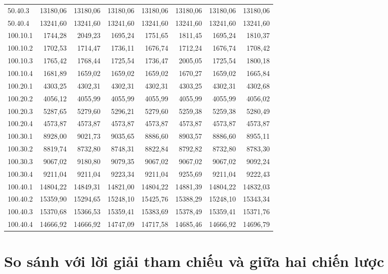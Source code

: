 \documentclass[../DoAn.tex]{subfiles}
\begin{document}
\begin{small}
\begin{longtable}{l|rrrrr|rr}
50.40.3 & 13180,06 & 13180,06 & 13180,06 & 13180,06 & 13180,06 & 13180,06 & 13180,06 \\
50.40.4 & 13241,60 & 13241,60 & 13241,60 & 13241,60 & 13241,60 & 13241,60 & 13241,60 \\
100.10.1 & 1744,28 & 2049,23 & 1695,24 & 1751,65 & 1811,45 & 1695,24 & 1810,37 \\
100.10.2 & 1702,53 & 1714,47 & 1736,11 & 1676,74 & 1712,24 & 1676,74 & 1708,42 \\
100.10.3 & 1765,42 & 1768,44 & 1725,54 & 1736,47 & 2005,05 & 1725,54 & 1800,18 \\
100.10.4 & 1681,89 & 1659,02 & 1659,02 & 1659,02 & 1670,27 & 1659,02 & 1665,84 \\
100.20.1 & 4303,25 & 4302,31 & 4302,31 & 4302,31 & 4303,25 & 4302,31 & 4302,68 \\
100.20.2 & 4056,12 & 4055,99 & 4055,99 & 4055,99 & 4055,99 & 4055,99 & 4056,02 \\
100.20.3 & 5287,65 & 5279,60 & 5296,21 & 5279,60 & 5259,38 & 5259,38 & 5280,49 \\
100.20.4 & 4573,87 & 4573,87 & 4573,87 & 4573,87 & 4573,87 & 4573,87 & 4573,87 \\
100.30.1 & 8928,00 & 9021,73 & 9035,65 & 8886,60 & 8903,57 & 8886,60 & 8955,11 \\
100.30.2 & 8819,74 & 8732,80 & 8748,31 & 8822,84 & 8792,82 & 8732,80 & 8783,30 \\
100.30.3 & 9067,02 & 9180,80 & 9079,35 & 9067,02 & 9067,02 & 9067,02 & 9092,24 \\
100.30.4 & 9211,04 & 9211,04 & 9223,34 & 9211,04 & 9255,69 & 9211,04 & 9222,43 \\
100.40.1 & 14804,22 & 14849,31 & 14821,00 & 14804,22 & 14881,39 & 14804,22 & 14832,03 \\
100.40.2 & 15359,90 & 15294,65 & 15248,10 & 15425,76 & 15388,29 & 15248,10 & 15343,34 \\
100.40.3 & 15370,68 & 15366,53 & 15359,41 & 15383,69 & 15378,49 & 15359,41 & 15371,76 \\
100.40.4 & 14666,92 & 14666,92 & 14747,09 & 14717,58 & 14685,46 & 14666,92 & 14696,79 \\
\end{longtable}
\end{small}

\section{So sánh với lời giải tham chiếu và giữa hai chiến lược}
\end{document}

